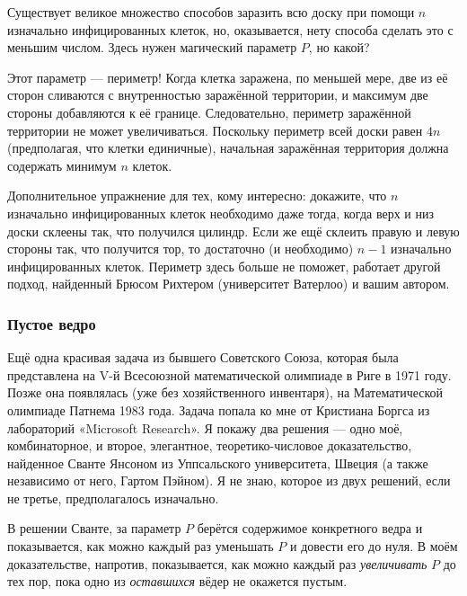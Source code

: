 Существует великое множество способов заразить всю доску при помощи $n$ изначально инфицированных клеток, но, оказывается, нету способа сделать это с меньшим числом.
Здесь нужен магический параметр $P$, но какой?

Этот параметр --- периметр!
Когда клетка заражена, по меньшей мере, две из её сторон сливаются с внутренностью заражённой территории, и максимум две стороны добавляются к её границе.
Следовательно, периметр заражённой территории не может увеличиваться.
Поскольку периметр всей доски равен $4n$ (предполагая, что клетки единичные), начальная заражённая территория должна содержать минимум $n$ клеток.
\heart

Дополнительное упражнение для тех, кому интересно: докажите, что $n$ изначально инфицированных клеток необходимо даже тогда, когда верх и низ доски склеены так, что получился цилиндр.
Если же ещё склеить правую и левую стороны так, что получится тор, то достаточно (и необходимо) $n-1$ изначально инфицированных клеток.
Периметр здесь больше не поможет,
работает другой подход, найденный Брюсом Рихтером (университет Ватерлоо) %
и вашим автором.

\subsubsection*{Пустое ведро}%

Ещё одна красивая задача из бывшего Советского Союза, которая была представлена на V-й Всесоюзной математической олимпиаде в Риге в 1971 году.
Позже она появлялась (уже без хозяйственного инвентаря), на Математической олимпиаде Патнема 1983 года.
Задача попала ко мне от Кристиана Боргса из лабораторий «Microsoft Research». %
Я покажу два решения --- одно моё, комбинаторное, и второе, элегантное, теоретико-числовое доказательство, найденное Сванте Янсоном из Уппсальского университета, Швеция %
(а также независимо от него, Гартом Пэйном). %
Я не знаю, которое из двух решений, если не третье, предполагалось изначально.

\medskip

В решении Сванте, за параметр $P$ берётся содержимое конкретного ведра и показывается, как можно каждый раз уменьшать $P$ и довести его до нуля.
В моём доказательстве, напротив, показывается, как можно каждый раз \emph{увеличивать} $P$ до тех пор, пока одно из \emph{оставшихся} вёдер не окажется пустым.

